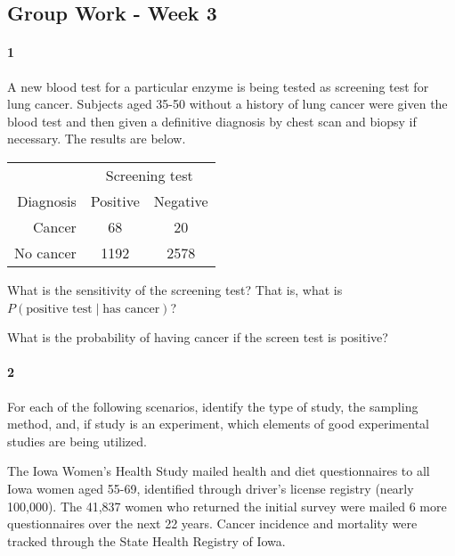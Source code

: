 \documentclass{article}
\begin{document}
\begin{flushleft}
\section*{Group Work - Week 3}

\paragraph{1} A new blood test for a particular enzyme is being tested as screening test for lung cancer. Subjects aged 35-50 without a history of lung cancer were given the blood test and then given a definitive diagnosis by chest scan and biopsy if necessary. The results are below.\\ \medskip
{\centering
\begin{tabular}{ r| c c}
& \multicolumn{2}{c}{Screening test}\\
Diagnosis & Positive & Negative\\
\hline
 Cancer &  68  &  20  \\
 No cancer  & 1192   &  2578 \\
\end{tabular}
\par}


\begin{enumalpha}
\item What is the sensitivity of the screening test? That is, what is $P(\text{positive test} \mid \text{has cancer})$?
\vspace{2.75in}

\item What is the probability of having cancer if the screen test is positive?
\vspace{1.75in}



\end{enumalpha}

\newpage
\paragraph{2} For each of the following scenarios, identify the type of study, the sampling method, and, if study is an experiment, which elements of good experimental studies are being utilized.

\begin{enumalpha}
\item The Iowa Women's Health Study mailed health and diet questionnaires to all Iowa women aged 55-69, identified through driver's license registry (nearly 100,000). The 41,837 women who returned the initial survey were mailed 6 more questionnaires over the next 22 years. Cancer incidence and mortality were tracked through the State Health Registry of Iowa.
\vspace{1in}


\end{enumalpha}
\end{flushleft}
\end{document}
